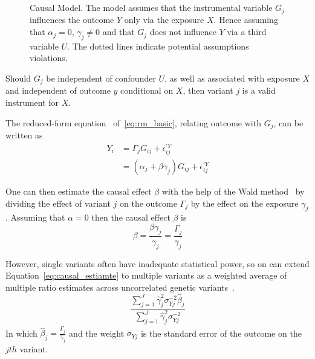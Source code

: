 \begin{figure}[!h]
  \centering
  \resizebox{0.5\textwidth}{!}{}
  \caption{Causal Model.
    The model assumes that the instrumental variable $G_j$ influences the outcome $Y$ only via the exposure $X$.
    Hence assuming that $\alpha_j=0$, $\gamma_j\neq0$ and that $G_j$ does not influence $Y$ via a third variable $U$. 
    The dotted lines indicate potential assumptions violations.
  }\label{fig:causal}
\end{figure}

Should $G_j$ be independent of confounder $U$,
as well as associated with exposure $X$ and independent of outcome $y$ conditional on $X$, then variant $j$ is a valid instrument for $X$.

The reduced-form equation~\cite{Bowden2015} of~\ref{eq:rm_basic}, relating outcome with $G_j$, can be written as
\begin{equation}
	\begin{split}
		Y_i &= \Gamma_j G_{ij} + \epsilon_{ij}^{'Y} \\
		&= (\alpha_j + \beta\gamma_j)G_{ij} + \epsilon_{ij}^{'Y}
	\end{split}
\end{equation}

One can then estimate the causal effect $\beta$ with the help of the Wald method~\cite{Wald1940}
by dividing the effect of variant $j$ on the outcome $\Gamma_j$ by the effect on the exposure $\gamma_j$.
Assuming that $\alpha=0$ then the causal effect $\beta$ is
\begin{equation} \label{eq:causal_estiamte}
	\beta = \frac{\beta\gamma_j}{\gamma_j}= \frac{\Gamma_j}{\gamma_j}
\end{equation}

However, single variants often have inadequate statistical power, so on can extend Equation~\ref{eq:causal_estiamte} to multiple variants as a weighted average of multiple ratio estimates across uncorrelated genetic variants~\cite{Bowden2015}.
\begin{equation} \label{eq:IVW}
  \frac{\sum^J_{j=1} \hat{\gamma}_j^2\sigma_{Yj}^{-2} \hat{\beta}_j}
  {\sum^J_{j=1} \hat{\gamma}_j^2\sigma_{Yj}^{-2}}
\end{equation}
In which $\hat{\beta}_j = \frac{\hat{\Gamma}_j}{\hat{\gamma}_j}$ and the weight $\sigma_{Yj}$ is the standard error of the outcome on the $jth$ variant.

